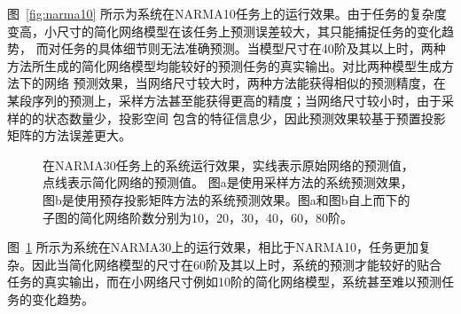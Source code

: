 图~\ref{fig:narma10} 所示为系统在NARMA10任务上的运行效果。由于任务的复杂度变高，小尺寸的简化网络模型在该任务上预测误差较大，其只能捕捉任务的变化趋势，
而对任务的具体细节则无法准确预测。当模型尺寸在40阶及其以上时，两种方法所生成的简化网络模型均能较好的预测任务的真实输出。对比两种模型生成方法下的网络
预测效果，当网络尺寸较大时，两种方法能获得相似的预测精度，在某段序列的预测上，采样方法甚至能获得更高的精度；当网络尺寸较小时，由于采样的的状态数量少，投影空间
包含的特征信息少，因此预测效果较基于预置投影矩阵的方法误差更大。
\begin{figure}[htb]
	\centering
	\caption{在NARMA30任务上的系统运行效果，实线表示原始网络的预测值，点线表示简化网络的预测值。
		图a是使用采样方法的系统预测效果，图b是使用预存投影矩阵方法的系统预测效果。图a和图b自上而下的子图的简化网络阶数分别为10，20，30，40，60，80阶。}
	\label{fig:narma30}
\end{figure}

图~\ref{fig:narma30} 所示为系统在NARMA30上的运行效果，相比于NARMA10，任务更加复杂。因此当简化网络模型的尺寸在60阶及其以上时，系统的预测才能较好的贴合
任务的真实输出，而在小网络尺寸例如10阶的简化网络模型，系统甚至难以预测任务的变化趋势。

